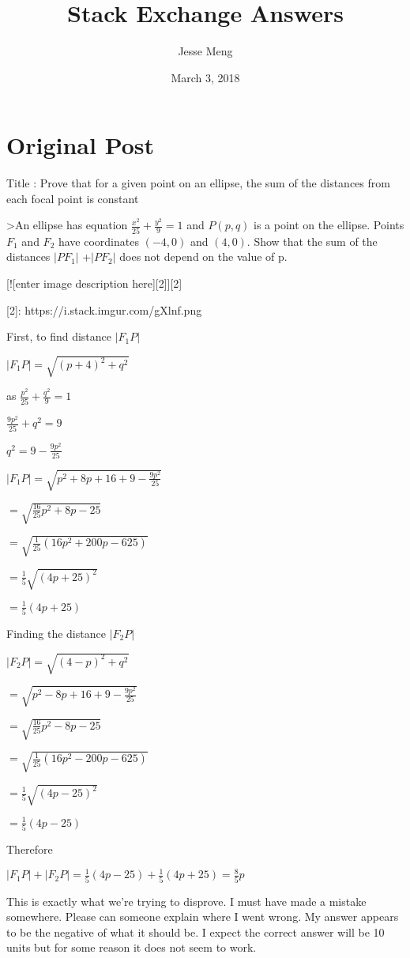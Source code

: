 \documentclass{article}
\title{Stack Exchange Answers}
\author{Jesse Meng }
\date{March 3, 2018}
\begin{document}
\maketitle

\section{Original Post}
Title : Prove that for a given point on an ellipse, the sum of the distances from each focal point is constant

>An ellipse has equation $\frac{x^2}{25}+\frac{y^2}{9} = 1$ and $P(p,q)$ is a point on the ellipse. Points $F_1$ and $F_2$ have coordinates $(-4,0)$ and $(4,0)$. Show that the sum of the distances $|PF_1|$ +$|PF_2|$ does not depend on the value of p.


[![enter image description here][2]][2]


  [2]: https://i.stack.imgur.com/gXlnf.png

First, to find  distance $|F_1P|$


$|F_1P| = \sqrt{(p+4)^2 + q^2}$

as $\frac{p^2}{25}+\frac{q^2}{9} = 1$

$\frac{9p^2}{25}+q^2 = 9$

$q^2 = 9-\frac{9p^2}{25}$

$|F_1P| = \sqrt{p^2+8p+16 + 9-\frac{9p^2}{25}}$

$= \sqrt{\frac{16}{25}p^2+8p-25}$

$= \sqrt{\frac{1}{25}(16p^2+200p-625)}$

$= \frac{1}{5}\sqrt{(4p+25)^2}$

$= \frac{1}{5}(4p+25)$



Finding the distance $|F_2P|$



$|F_2P| = \sqrt{(4-p)^2 + q^2}$

$= \sqrt{p^2-8p+16 + 9-\frac{9p^2}{25}}$

$= \sqrt{\frac{16}{25}p^2-8p-25}$

$= \sqrt{\frac{1}{25}(16p^2-200p-625)}$

$= \frac{1}{5}\sqrt{(4p-25)^2}$

$= \frac{1}{5}(4p-25)$

Therefore 

$|F_1P|+|F_2P|= \frac{1}{5}(4p-25)+\frac{1}{5}(4p+25) = \frac{8}{5}p$

This is exactly what we're trying to disprove. I must have made a mistake somewhere. Please can someone explain where I went wrong. My answer appears to be the negative of what it should be. I expect the correct answer will be 10 units but for some reason it does not seem to work.
\end{document}
